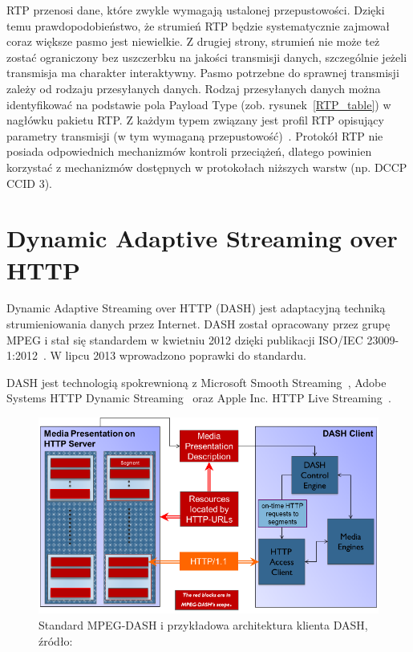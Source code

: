 RTP przenosi dane, które zwykle wymagają ustalonej przepustowości. Dzięki temu prawdopodobieństwo, że strumień RTP będzie systematycznie zajmował coraz większe pasmo jest niewielkie. Z drugiej strony, strumień nie może też zostać ograniczony bez uszczerbku na jakości transmisji danych, szczególnie jeżeli transmisja ma charakter interaktywny. Pasmo potrzebne do sprawnej transmisji zależy od rodzaju przesyłanych danych. Rodzaj przesyłanych danych można identyfikować na podstawie pola Payload Type (zob. rysunek~\ref{RTP_table}) w nagłówku pakietu RTP. Z każdym typem związany jest profil RTP opisujący parametry transmisji (w tym wymaganą przepustowość)~\cite{RFC3551}. Protokół RTP nie posiada odpowiednich mechanizmów kontroli przeciążeń, dlatego powinien korzystać z mechanizmów dostępnych w protokołach niższych warstw (np. DCCP CCID 3).

\section{Dynamic Adaptive Streaming over HTTP}

Dynamic Adaptive Streaming over HTTP (DASH) jest adaptacyjną techniką strumieniowania danych przez Internet. DASH został opracowany przez grupę MPEG i stał się standardem w kwietniu 2012 dzięki publikacji ISO/IEC 23009-1:2012~\cite{ISO-IEC-DASH}. W lipcu 2013 wprowadzono poprawki do standardu.

DASH jest technologią spokrewnioną z Microsoft Smooth Streaming~\cite{MicroS}, Adobe Systems HTTP Dynamic Streaming~\cite{ADOBES} oraz Apple Inc. HTTP Live Streaming~\cite{APPLES}.

\begin{figure}[h!]
	\centering
		\includegraphics{dash}
	\caption{Standard MPEG-DASH i przykładowa architektura klienta DASH, źródło:~\cite{DASH}}
	\label{dash}
\end{figure}

